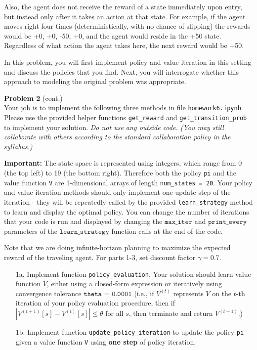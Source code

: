 \documentclass[submit]{harvardml}
\begin{document}
\begin{problem}
Also, the agent does not receive the reward of a state immediately upon entry, but instead only after it takes an action at that state. For example, if the agent moves right four times (deterministically, with no chance of slipping) the rewards would be +0, +0, -50, +0, and the agent would reside in the +50 state. Regardless of what action the agent takes here, the next reward would be +50.

In this problem, you will first implement policy and value iteration in this setting and discuss the policies that you find.  Next, you will interrogate whether this approach to modeling the original problem was appropriate.

\end{problem}
\newpage

\begin{framed}
\textbf{Problem 2} (cont.)\\

Your job is to implement the following three methods in file \texttt{homework6.ipynb}. Please use the provided helper functions \texttt{get\_reward} and \texttt{get\_transition\_prob} to implement your solution. \emph{Do not use any outside code.  (You may still collaborate with others according to the standard collaboration policy in the syllabus.)}  

\textbf{Important: } The state space is represented using integers, which range from 0 (the top left) to 19 (the bottom right). Therefore both the policy \texttt{pi} and the value function \texttt{V} are 1-dimensional arrays of length \texttt{num\_states = 20}. Your policy and value iteration methods should only implement one update step of the iteration - they will be repeatedly called by the provided \texttt{learn\_strategy} method to learn and display the optimal policy. You can change the number of iterations that your code is run and displayed by changing the $\texttt{max\_iter}$ and $\texttt{print\_every}$ parameters of the $\texttt{learn\_strategy}$ function calls at the end of the code.

Note that we are doing infinite-horizon planning to maximize the expected reward of the traveling agent. For parts 1-3, set discount factor $\gamma = 0.7$.

\begin{itemize}
    \item[1a.]  Implement function \texttt{policy\_evaluation}.  Your
      solution should learn value function $V$, either using a closed-form expression or iteratively using
      convergence tolerance $\texttt{theta = 0.0001}$ (i.e., if
      $V^{(t)}$ represents $V$ on the $t$-th iteration of your policy
      evaluation procedure, then if $|V^{(t + 1)}[s] - V^{(t)}[s]|
      \leq \theta$ for all $s$, then terminate and return $V^{(t + 1)}$.)
    \item[1b.] Implement function \texttt{update\_policy\_iteration} to update the policy \texttt{pi} given a value function \texttt{V} using \textbf{one step} of policy iteration.
    

\end{itemize}
\end{framed}
\end{document}
